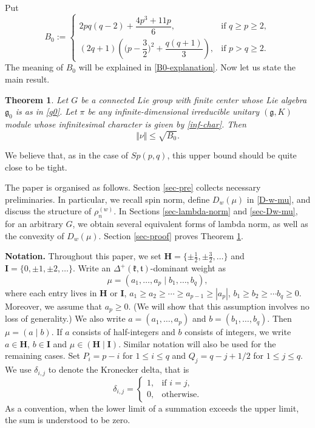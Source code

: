 \documentclass[11pt]{amsart}
\theoremstyle{plain}
\newtheorem{thm}{Theorem}[section]
\theoremstyle{definition}
\newcommand{\frg}{\mathfrak{g}}
\newcommand{\mfk}{\mathfrak{k}}
\newcommand{\mft}{\mathfrak{t}}
\begin{document}
Put
\begin{equation}\label{B0}
	B_0:=\left\{
	\begin{array}{ll}
		2pq(q-2)+\dfrac{4p^3+11p}{6}, & \mbox{if $q\ge p\ge 2$},\\
		(2q+1)\left(\bigg(p-\dfrac{3}{2}\bigg)^2+\dfrac{q(q+1)}{3}\right), & \mbox{if $p>q\ge 2$}.
	\end{array}
	\right.
\end{equation}
The meaning of $B_0$ will be explained in \eqref{B0-explanation}. Now let us state the main result.

\begin{thm}\label{thm-main}
Let $G$ be a connected Lie group with finite center whose Lie algebra $\frg_0$ is as in \eqref{g0}.
Let $\pi$ be any  infinite-dimensional irreducible unitary $(\frg, K)$ module whose
 infinitesimal character is given by \eqref{inf-char}. Then
	\[\Vert\nu\Vert\le \sqrt{B_0}.\]
\end{thm}

We believe that, as in the case of $Sp(p, q)$, this upper bound should be quite close to be tight.

The paper is organised as follows. Section \ref{sec-pre} collects necessary preliminaries. In particular, we recall spin norm, define $D_w(\mu)$ in \eqref{D-w-mu}, and discuss the structure of $\rho_n^{(w)}$.  In Sections \ref{sec-lambda-norm} and \ref{sec-Dw-mu}, for an arbitrary $G$, we obtain several equivalent forms of lambda norm, as well as the convexity of $D_w(\mu)$. Section \ref{sec-proof} proves Theorem \ref{thm-main}.

\medskip

\noindent \textbf{Notation.} Throughout this paper, we set
$\textbf{H}=\{\pm \frac{1}{2}, \pm \frac{3}{2}, \dots \}$ and $\textbf{I}=\{0, \pm 1, \pm 2, \dots\}$.
Write an $\Delta^+(\mfk,\mft)$-dominant weight as
\begin{equation}\label{mu}
	\mu=(a_1, \dots, a_p \mid b_1, \dots, b_q),
\end{equation}
where each entry lives in \textbf{H} or \textbf{I},  $a_1\ge a_2\ge \cdots \ge a_{p-1} \ge |a_p|$,
$b_1\ge b_2\ge \cdots b_q\ge 0$.
Moreover, we assume that $a_p\ge 0$. (We will show that this assumption involves no loss of generality.) We also write $a=(a_1,\dots,a_p)$ and $b=(b_1,\dots,b_q)$. Then $\mu=(a\mid b)$. If $a$ consists of half-integers and $b$ consists of integers, we write $a\in \textbf{H}$, $b\in \textbf{I}$ and $\mu \in (\textbf{H}\mid \textbf{I})$. Similar notation will also be used for the remaining cases. Set $P_i=p-i$ for $1\le i\le q$ and $Q_j=q-j+1/2$ for $1\le j\le q$. We use $\delta_{i,j}$ to denote the Kronecker delta, that is
\[\delta_{i,j}=\left\{
\begin{array}{ll}
	1, & \mbox{if $i=j$},\\
	0, & \mbox{otherwise}.
\end{array}
\right. \]
As a convention, when the lower limit of a summation exceeds the upper limit, the sum is understood to be zero.
\end{document}
